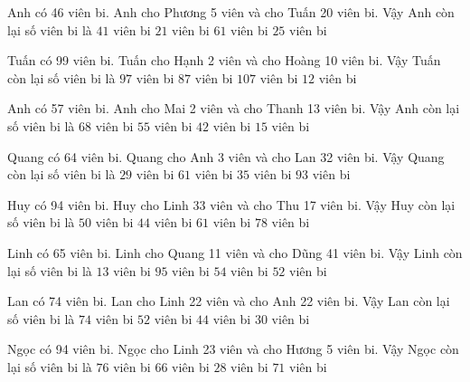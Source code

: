 \documentclass[12pt,a4paper]{article}
\begin{document}
\begin{ex}
Anh có 46 viên bi. Anh cho Phương 5 viên và cho Tuấn 20 viên bi. Vậy Anh còn lại số viên bi là
 \choice 
{$41$ viên bi}
{\True $21$ viên bi}
{$61$ viên bi}
{$25$ viên bi}
\end{ex}
\begin{ex}
Tuấn có 99 viên bi. Tuấn cho Hạnh 2 viên và cho Hoàng 10 viên bi. Vậy Tuấn còn lại số viên bi là
 \choice 
{$97$ viên bi}
{\True $87$ viên bi}
{$107$ viên bi}
{$12$ viên bi}
\end{ex}
\begin{ex}
Anh có 57 viên bi. Anh cho Mai 2 viên và cho Thanh 13 viên bi. Vậy Anh còn lại số viên bi là
 \choice 
{$68$ viên bi}
{$55$ viên bi}
{\True $42$ viên bi}
{$15$ viên bi}
\end{ex}
\begin{ex}
Quang có 64 viên bi. Quang cho Anh 3 viên và cho Lan 32 viên bi. Vậy Quang còn lại số viên bi là
 \choice 
{\True $29$ viên bi}
{$61$ viên bi}
{$35$ viên bi}
{$93$ viên bi}
\end{ex}
\begin{ex}
Huy có 94 viên bi. Huy cho Linh 33 viên và cho Thu 17 viên bi. Vậy Huy còn lại số viên bi là
 \choice 
{$50$ viên bi}
{\True $44$ viên bi}
{$61$ viên bi}
{$78$ viên bi}
\end{ex}
\begin{ex}
Linh có 65 viên bi. Linh cho Quang 11 viên và cho Dũng 41 viên bi. Vậy Linh còn lại số viên bi là
 \choice 
{\True $13$ viên bi}
{$95$ viên bi}
{$54$ viên bi}
{$52$ viên bi}
\end{ex}
\begin{ex}
Lan có 74 viên bi. Lan cho Linh 22 viên và cho Anh 22 viên bi. Vậy Lan còn lại số viên bi là
 \choice 
{$74$ viên bi}
{$52$ viên bi}
{$44$ viên bi}
{\True $30$ viên bi}
\end{ex}
\begin{ex}
Ngọc có 94 viên bi. Ngọc cho Linh 23 viên và cho Hương 5 viên bi. Vậy Ngọc còn lại số viên bi là
 \choice 
{$76$ viên bi}
{\True $66$ viên bi}
{$28$ viên bi}
{$71$ viên bi}
\end{ex}
\end{document}
